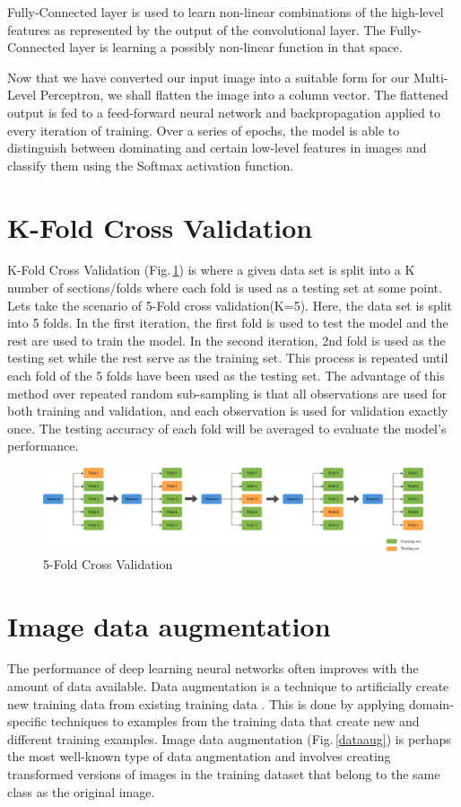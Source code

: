Fully-Connected layer is used to learn non-linear combinations of the high-level features as represented by the output of the convolutional layer. The Fully-Connected layer is learning a possibly non-linear function in that space.

Now that we have converted our input image into a suitable form for our Multi-Level Perceptron, we shall flatten the image into a column vector. The flattened output is fed to a feed-forward neural network and backpropagation applied to every iteration of training. Over a series of epochs, the model is able to distinguish between dominating and certain low-level features in images and classify them using the Softmax activation function.

\section{K-Fold Cross Validation}
K-Fold Cross Validation \citep{Kohavi95astudy} (Fig.\,\ref{kfold}) is where a given data set is split into a K number of sections/folds where each fold is used as a testing set at some point. Lets take the scenario of 5-Fold cross validation(K=5). Here, the data set is split into 5 folds. In the first iteration, the first fold is used to test the model and the rest are used to train the model. In the second iteration, 2nd fold is used as the testing set while the rest serve as the training set. This process is repeated until each fold of the 5 folds have been used as the testing set. The advantage of this method over repeated random sub-sampling is that all observations are used for both training and validation, and each observation is used for validation exactly once. The testing accuracy of each fold will be averaged to evaluate the model's performance. 

\begin{figure}[h]
	\centering
	\includegraphics[width=\textwidth]{Figs/kfold.png}
    \caption{5-Fold Cross Validation}
    \label{kfold}
\end{figure}


\section{Image data augmentation}
The performance of deep learning neural networks often improves with the amount of data available. Data augmentation is a technique to artificially create new training data from existing training data  \citep{Mikolajczyk2018}. This is done by applying domain-specific techniques to examples from the training data that create new and different training examples.
Image data augmentation (Fig.\,\ref{dataaug}) is perhaps the most well-known type of data augmentation and involves creating transformed versions of images in the training dataset that belong to the same class as the original image.

